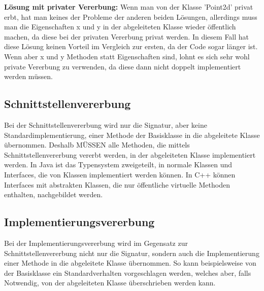 			{\bfseries Lösung mit privater Vererbung:}
			\UseRawInputEncoding{}
			Wenn man von der Klasse 'Point2d' privat erbt, hat man keines der Probleme der anderen beiden Lösungen,
			allerdings muss man die Eigenschaften x und y in der abgeleiteten Klasse wieder öffentlich machen, da diese bei
			der privaten Vererbung privat werden. In diesem Fall hat diese Lösung keinen Vorteil im Vergleich zur ersten, da
			der Code sogar länger ist. Wenn aber x und y Methoden statt Eigenschaften sind, lohnt es sich sehr wohl private
			Vererbung zu verwenden, da diese dann nicht doppelt implementiert werden müssen.
			
	
	\subsection{Schnittstellenvererbung}
		Bei der Schnittstellenvererbung wird nur die Signatur, aber keine Standardimplementierung, einer Methode der
		Basisklasse	in die abgeleitete Klasse übernommen. Deshalb MÜSSEN alle Methoden, die mittels Schnittstellenvererbung
		vererbt werden, in der abgeleiteten Klasse implementiert werden. In Java ist das Typensystem zweigeteilt, in normale
		Klassen und Interfaces, die von Klassen implementiert werden können. In C++ können Interfaces mit abstrakten Klassen,
		die nur öffentliche virtuelle Methoden enthalten, nachgebildet werden.
		
	\subsection{Implementierungsvererbung}
		Bei der Implementierungsvererbung wird im Gegensatz zur Schnittstellenvererbung nicht nur die Signatur, sondern auch
		die Implementierung einer Methode in die abgeleitete Klasse übernommen. So kann beispielsweise von der Basisklasse ein
		Standardverhalten vorgeschlagen werden, welches aber, falls Notwendig, von der abgeleiteten Klasse überschrieben werden
		kann.
		
